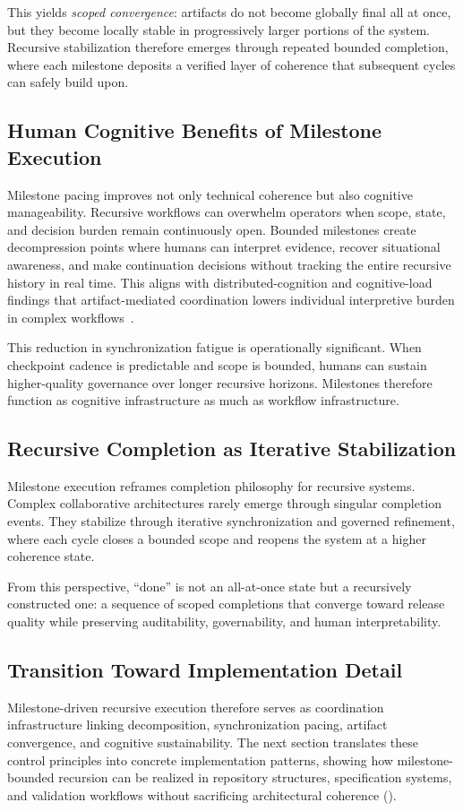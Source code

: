 This yields \textit{scoped convergence}: artifacts do not become globally final all at once, but they become locally stable in progressively larger portions of the system. Recursive stabilization therefore emerges through repeated bounded completion, where each milestone deposits a verified layer of coherence that subsequent cycles can safely build upon.

\subsection{Human Cognitive Benefits of Milestone Execution}

Milestone pacing improves not only technical coherence but also cognitive manageability. Recursive workflows can overwhelm operators when scope, state, and decision burden remain continuously open. Bounded milestones create decompression points where humans can interpret evidence, recover situational awareness, and make continuation decisions without tracking the entire recursive history in real time. This aligns with distributed-cognition and cognitive-load findings that artifact-mediated coordination lowers individual interpretive burden in complex workflows~\cite{Hutchins1995CognitionWild,Sweller1988CognitiveLoad}.

This reduction in synchronization fatigue is operationally significant. When checkpoint cadence is predictable and scope is bounded, humans can sustain higher-quality governance over longer recursive horizons. Milestones therefore function as cognitive infrastructure as much as workflow infrastructure.

\subsection{Recursive Completion as Iterative Stabilization}

Milestone execution reframes completion philosophy for recursive systems. Complex collaborative architectures rarely emerge through singular completion events. They stabilize through iterative synchronization and governed refinement, where each cycle closes a bounded scope and reopens the system at a higher coherence state.

From this perspective, ``done'' is not an all-at-once state but a recursively constructed one: a sequence of scoped completions that converge toward release quality while preserving auditability, governability, and human interpretability.

\subsection{Transition Toward Implementation Detail}

Milestone-driven recursive execution therefore serves as coordination infrastructure linking decomposition, synchronization pacing, artifact convergence, and cognitive sustainability. The next section translates these control principles into concrete implementation patterns, showing how milestone-bounded recursion can be realized in repository structures, specification systems, and validation workflows without sacrificing architectural coherence ().
